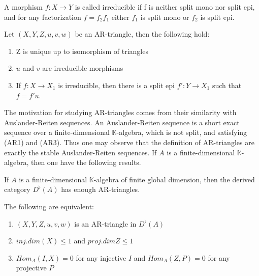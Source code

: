         \begin{definition}
            A morphism $f:X\rightarrow Y$ is called irreducible if f is neither split mono nor split epi, and for any factorization $f=f_2f_1$ either $f_1$ is split mono or $f_2$ is split epi.
        \end{definition}

        \begin{prop}
            Let $(X,Y,Z,u,v,w)$ be an AR-triangle, then the following hold:
            \begin{enumerate}
                \item Z is unique up to isomorphism of triangles
                \item $u$ and $v$ are irreducible morphisms
                \item If $f:X\rightarrow X_1$ is irreducible, then there is a split epi $f':Y\rightarrow X_1$ such that $f=f'u$.
            \end{enumerate}
        \end{prop}

        The motivation for studying AR-triangles comes from their similarity with Auslander-Reiten sequences. An Auslander-Reiten sequence is a short exact sequence over a finite-dimensional $\mathbb{K}$-algebra, which is not split, and satisfying (AR1) and (AR3). Thus one may observe that the definition of AR-triangles are exactly the stable Auslander-Reiten sequences. If $A$ is a finite-dimensional $\mathbb{K}$-algebra, then one have the following results.

        \begin{theorem}
            If $A$ is a finite-dimensional $\mathbb{K}$-algebra of finite global dimension, then the derived category $D^{\flat}(A)$ has enough AR-triangles.
        \end{theorem}

        \begin{prop}
            The following are equivalent:
            \begin{enumerate}
                \item $(X,Y,Z,u,v,w)$ is an AR-triangle in $D^{\flat}(A)$
                \item $inj.dim(X)\leq 1$ and $proj.dim Z \leq 1$
                \item $Hom_A(I,X)=0$ for any injective $I$ and $Hom_A(Z,P)=0$ for any projective $P$
            \end{enumerate}
        \end{prop}
    



% 
% 